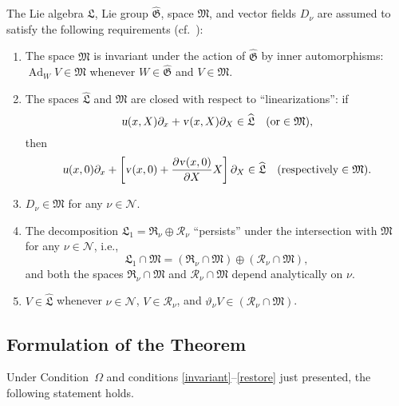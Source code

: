 \documentclass[12pt,reqno]{amsart}
\theoremstyle{definition}
\begin{document}
The Lie algebra ${\widehat{\mathfrak L}}$, Lie group ${\widehat{\mathfrak G}}$, space ${\mathfrak M}$, and vector fields
$D_\nu$ are assumed to satisfy the following requirements (cf.~\cite{S11}):
\begin{enumerate}
\item\label{invariant} The space ${\mathfrak M}$ is invariant under the action of ${\widehat{\mathfrak G}}$
by inner automorphisms: $\operatorname{Ad}_WV\in{\mathfrak M}$ whenever $W\in{\widehat{\mathfrak G}}$ and $V\in{\mathfrak M}$.
\item\label{linear} The spaces ${\widehat{\mathfrak L}}$ and ${\mathfrak M}$ are closed with respect to
``linearizations'': if
\[
{\text{\textsl{u}}}(x,X)\partial_x+{\text{\textsl{v}}}(x,X)\partial_X\in{\widehat{\mathfrak L}} \quad (\text{or}\in{\mathfrak M}),
\]
then
\[
{\text{\textsl{u}}}(x,0)\partial_x+
\left[{\text{\textsl{v}}}(x,0)+\frac{\partial{\text{\textsl{v}}}(x,0)}{\partial X}X\right]\partial_X\in{\widehat{\mathfrak L}}
\quad (\text{respectively}\in{\mathfrak M}).
\]
\item\label{D} $D_\nu\in{\mathfrak M}$ for any $\nu\in{\mathcal N}$.
\item\label{intersect} The decomposition ${\mathfrak L}_1={\mathfrak R}_\nu\oplus{\mathcal R}_\nu$
``persists'' under the intersection with ${\mathfrak M}$ for any $\nu\in{\mathcal N}$, i.e.,
\[
{\mathfrak L}_1\cap{\mathfrak M}=({\mathfrak R}_\nu\cap{\mathfrak M})\oplus({\mathcal R}_\nu\cap{\mathfrak M}),
\]
and both the spaces ${\mathfrak R}_\nu\cap{\mathfrak M}$ and ${\mathcal R}_\nu\cap{\mathfrak M}$ depend analytically
on $\nu$.
\item\label{restore} $V\in{\widehat{\mathfrak L}}$ whenever $\nu\in{\mathcal N}$, $V\in{\mathcal R}_\nu$, and
${\vartheta}_\nu V\in({\mathcal R}_\nu\cap{\mathfrak M})$.
\end{enumerate}

\subsection{Formulation of the Theorem}\label{form}

Under Condition~$\Omega$ and conditions \mbox{\ref{invariant}--\ref{restore}}
just presented, the following statement holds.
\end{document}
